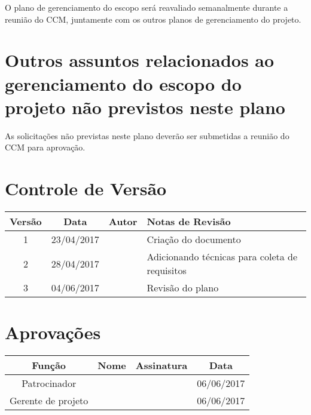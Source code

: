 O plano de gerenciamento do escopo será reavaliado semanalmente durante a reunião do CCM, juntamente com os outros planos de gerenciamento do projeto.

\section{Outros assuntos relacionados ao gerenciamento do escopo do projeto não previstos neste plano}

As solicitações não previstas neste plano deverão ser submetidas a reunião do CCM para aprovação.

\section{Controle de Versão}

\begin{table}[H]
	\begin{tabularx}{\textwidth}{| c | c | X | X |}
		\hline
		\textbf{Versão} & \textbf{Data} & \textbf{Autor}        & \textbf{Notas de Revisão}                      \\
		\hline
		1                & 23/04/2017    & \projectManagerName{} & Criação do documento                          \\
		\hline
		2                & 28/04/2017    & \projectManagerName{} & Adicionando técnicas para coleta de requisitos \\
		\hline
		3                & 04/06/2017    & \projectManagerName{} & Revisão do plano                               \\
		\hline
	\end{tabularx}
	\centering
\end{table}

\section{Aprovações}

\begin{table}[H]
	\begin{tabularx}{\textwidth}{| c | c | X | c |}
		\hline
		\textbf{Função}  & \textbf{Nome}         & \textbf{Assinatura}        & \textbf{Data} \\
		\hline
		Patrocinador       & \projectSponsorName{} & \projectSponsorSignature{} & 06/06/2017    \\
		\hline
		Gerente de projeto & \projectManagerName{} & \projectManagerSignature{} & 06/06/2017    \\
		\hline
	\end{tabularx}
	\centering
\end{table}